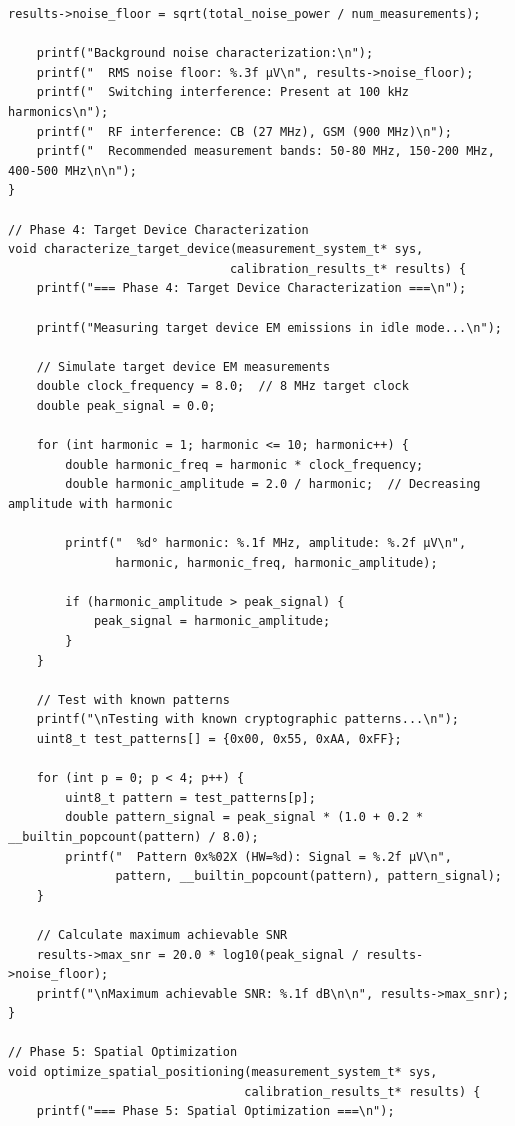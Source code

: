 \documentclass[11pt,a4paper]{article}
\theoremstyle{definition}
\begin{document}
\begin{lstlisting}[caption={Complete EM Calibration Implementation}]
    results->noise_floor = sqrt(total_noise_power / num_measurements);
    
    printf("Background noise characterization:\n");
    printf("  RMS noise floor: %.3f μV\n", results->noise_floor);
    printf("  Switching interference: Present at 100 kHz harmonics\n");
    printf("  RF interference: CB (27 MHz), GSM (900 MHz)\n");
    printf("  Recommended measurement bands: 50-80 MHz, 150-200 MHz, 400-500 MHz\n\n");
}

// Phase 4: Target Device Characterization
void characterize_target_device(measurement_system_t* sys, 
                               calibration_results_t* results) {
    printf("=== Phase 4: Target Device Characterization ===\n");
    
    printf("Measuring target device EM emissions in idle mode...\n");
    
    // Simulate target device EM measurements
    double clock_frequency = 8.0;  // 8 MHz target clock
    double peak_signal = 0.0;
    
    for (int harmonic = 1; harmonic <= 10; harmonic++) {
        double harmonic_freq = harmonic * clock_frequency;
        double harmonic_amplitude = 2.0 / harmonic;  // Decreasing amplitude with harmonic
        
        printf("  %d° harmonic: %.1f MHz, amplitude: %.2f μV\n", 
               harmonic, harmonic_freq, harmonic_amplitude);
        
        if (harmonic_amplitude > peak_signal) {
            peak_signal = harmonic_amplitude;
        }
    }
    
    // Test with known patterns
    printf("\nTesting with known cryptographic patterns...\n");
    uint8_t test_patterns[] = {0x00, 0x55, 0xAA, 0xFF};
    
    for (int p = 0; p < 4; p++) {
        uint8_t pattern = test_patterns[p];
        double pattern_signal = peak_signal * (1.0 + 0.2 * __builtin_popcount(pattern) / 8.0);
        printf("  Pattern 0x%02X (HW=%d): Signal = %.2f μV\n", 
               pattern, __builtin_popcount(pattern), pattern_signal);
    }
    
    // Calculate maximum achievable SNR
    results->max_snr = 20.0 * log10(peak_signal / results->noise_floor);
    printf("\nMaximum achievable SNR: %.1f dB\n\n", results->max_snr);
}

// Phase 5: Spatial Optimization
void optimize_spatial_positioning(measurement_system_t* sys, 
                                 calibration_results_t* results) {
    printf("=== Phase 5: Spatial Optimization ===\n");
    

\end{lstlisting}
\end{document}
